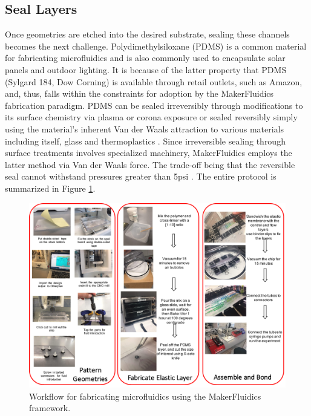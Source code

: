 \subsection{Seal Layers}
Once geometries are etched into the desired substrate, sealing these channels becomes the next challenge. Polydimethylsiloxane (PDMS) is a common material for fabricating microfluidics \cite{mcdonald2002poly} and is also commonly used to encapsulate solar panels and outdoor lighting. It is because of the latter property that PDMS (Sylgard 184, Dow Corning) is available through retail outlets, such as Amazon, and, thus, falls within the constraints for adoption by the MakerFluidics fabrication paradigm. PDMS can be sealed irreversibly through modifications to its surface chemistry via plasma or corona exposure or sealed reversibly simply using the material's inherent Van der Waals attraction to various materials including itself, glass and thermoplastics \cite{mcdonald2002poly}. Since irreversible sealing through surface treatments involves specialized machinery, MakerFluidics employs the latter method via Van der Waals force. The trade-off being that the reversible seal cannot withstand pressures greater than 5psi \cite{mcdonald2002poly}. The entire protocol is summarized in Figure \ref{fig:fabFlow}.


\begin{figure}[h]
  \begin{minipage}[t]{0.99\linewidth}\centering
    \includegraphics[width=14cm]{fabFlow.pdf}
    \medskip
  \end{minipage}\hfill
  \caption[MakerFluidics Fabrication Protocol]{Workflow for fabricating microfluidics using the MakerFluidics framework.}
    \label{fig:fabFlow}
\end{figure}




